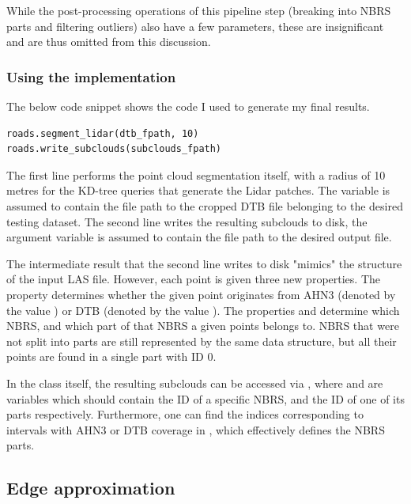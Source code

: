 While the post-processing operations of this pipeline step (breaking into NBRS parts and filtering outliers) also have a few parameters, these are insignificant and are thus omitted from this discussion.

\subsubsection{Using the implementation}

The below code snippet shows the code I used to generate my final results.

\begin{lstlisting}
roads.segment_lidar(dtb_fpath, 10)
roads.write_subclouds(subclouds_fpath)
\end{lstlisting}

The first line performs the point cloud segmentation itself, with a radius of 10 metres for the KD-tree queries that generate the Lidar patches. The variable  is assumed to contain the file path to the cropped DTB file belonging to the desired testing dataset. The second line writes the resulting subclouds to disk, the argument variable is assumed to contain the file path to the desired output file.

The intermediate result that the second line writes to disk "mimics" the structure of the input LAS file. However, each point is given three new properties. The property  determines whether the given point originates from AHN3 (denoted by the value ) or DTB (denoted by the value ). The properties  and  determine which NBRS, and which part of that NBRS a given points belongs to. NBRS that were not split into parts are still represented by the same data structure, but all their points are found in a single part with ID 0.

In the class itself, the resulting subclouds can be accessed via , where  and  are variables which should contain the ID of a specific NBRS, and the ID of one of its parts respectively. Furthermore, one can find the indices corresponding to intervals with AHN3 or DTB coverage in , which effectively defines the NBRS parts.

\subsection{Edge approximation}
\label{sub:r_edgeapproximation}

